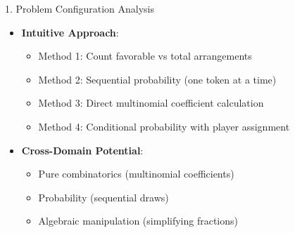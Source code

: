 \documentclass[12pt]{article}
\begin{document}
\begin{configbox}{1. Problem Configuration Analysis}
\begin{itemize}[leftmargin=*]
    \item \textbf{Intuitive Approach}: 
    \begin{itemize}
        \item Method 1: Count favorable vs total arrangements
        \item Method 2: Sequential probability (one token at a time)
        \item Method 3: Direct multinomial coefficient calculation
        \item Method 4: Conditional probability with player assignment
    \end{itemize}
    
    \item \textbf{Cross-Domain Potential}: 
    \begin{itemize}
        \item Pure combinatorics (multinomial coefficients)
        \item Probability (sequential draws)
        \item Algebraic manipulation (simplifying fractions)
    \end{itemize}
\end{itemize}

\end{configbox}
\end{document}
